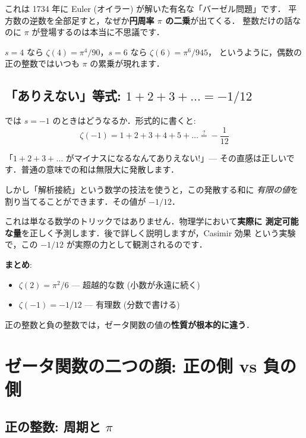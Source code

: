 \documentclass[11pt,a4paper]{article}
\begin{document}
これは 1734 年に Euler (オイラー) が解いた有名な「バーゼル問題」です．
平方数の逆数を全部足すと，なぜか\textbf{円周率 $\pi$ の二乗}が出てくる．
整数だけの話なのに $\pi$ が登場するのは本当に不思議です．

$s = 4$ なら $\zeta(4) = \pi^4/90$，$s = 6$ なら $\zeta(6) = \pi^6/945$，
というように，偶数の正の整数ではいつも $\pi$ の累乗が現れます．

\subsection{「ありえない」等式: $1 + 2 + 3 + \ldots = -1/12$}

では $s = -1$ のときはどうなるか．形式的に書くと:
\begin{equation*}
\zeta(-1) = 1 + 2 + 3 + 4 + 5 + \ldots \stackrel{?}{=} -\frac{1}{12}
\end{equation*}

「$1 + 2 + 3 + \ldots$ がマイナスになるなんてありえない!」---
その直感は正しいです．普通の意味での和は無限大に発散します．

しかし「解析接続」という数学の技法を使うと，この発散する和に
\emph{有限の値}を割り当てることができます．その値が $-1/12$．

これは単なる数学のトリックではありません．物理学において\textbf{実際に
測定可能な量}を正しく予測します．後で詳しく説明しますが，Casimir 効果
という実験で，この $-1/12$ が実際の力として観測されるのです．

\begin{tcolorbox}[colback=blue!5,colframe=blue!50!black]
\textbf{まとめ}:
\begin{itemize}
\item $\zeta(2) = \pi^2/6$ --- 超越的な数 (小数が永遠に続く)
\item $\zeta(-1) = -1/12$ --- 有理数 (分数で書ける)
\end{itemize}
正の整数と負の整数では，ゼータ関数の値の\textbf{性質が根本的に違う}．
\end{tcolorbox}

\section{ゼータ関数の二つの顔: 正の側 vs 負の側}

\subsection{正の整数: 周期と $\pi$}
\end{document}
